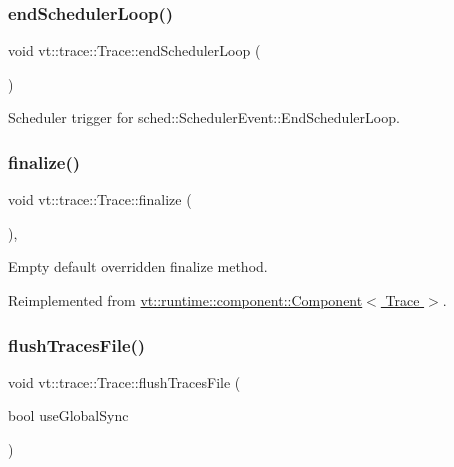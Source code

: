 \subsubsection{\texorpdfstring{end\+Scheduler\+Loop()}{endSchedulerLoop()}}
{\footnotesize\ttfamily void vt\+::trace\+::\+Trace\+::end\+Scheduler\+Loop (\begin{DoxyParamCaption}{ }\end{DoxyParamCaption})}



Scheduler trigger for {\ttfamily sched\+::\+Scheduler\+Event\+::\+End\+Scheduler\+Loop}. 

\mbox{\label{structvt_1_1trace_1_1_trace_a571333fa708843b1b24079eccfc3ba93}} 
\subsubsection{\texorpdfstring{finalize()}{finalize()}}
{\footnotesize\ttfamily void vt\+::trace\+::\+Trace\+::finalize (\begin{DoxyParamCaption}{ }\end{DoxyParamCaption})\hspace{0.3cm}{\ttfamily [override]}, {\ttfamily [virtual]}}



Empty default overridden finalize method. 



Reimplemented from \hyperlink{structvt_1_1runtime_1_1component_1_1_component_a098e362de01af6054e5491fba671a959}{vt\+::runtime\+::component\+::\+Component$<$ Trace $>$}.

\mbox{\label{structvt_1_1trace_1_1_trace_a2e07094a48c47b9c591003f0b57305c7}} 
\subsubsection{\texorpdfstring{flush\+Traces\+File()}{flushTracesFile()}}
{\footnotesize\ttfamily void vt\+::trace\+::\+Trace\+::flush\+Traces\+File (\begin{DoxyParamCaption}\item[{bool}]{use\+Global\+Sync }\end{DoxyParamCaption})}



